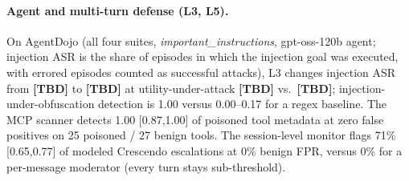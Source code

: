 \documentclass[11pt]{article}
\newcommand{\pending}{\textbf{[TBD]}}
\begin{document}
\paragraph{Agent and multi-turn defense (L3, L5).} On AgentDojo (all four suites, \emph{important\_instructions},
gpt-oss-120b agent; injection ASR is the share of episodes in which the injection goal was executed, with
errored episodes counted as successful attacks), L3 changes injection ASR from \pending{} to \pending{} at
utility-under-attack \pending{} vs.\ \pending; injection-under-obfuscation
detection is 1.00 versus 0.00--0.17 for a regex baseline. The MCP scanner detects 1.00 [0.87,1.00] of
poisoned tool metadata at zero false positives on 25 poisoned / 27 benign tools. The session-level
monitor flags 71\% [0.65,0.77] of modeled Crescendo escalations at 0\% benign FPR, versus 0\% for a
per-message moderator (every turn stays sub-threshold).
\end{document}

